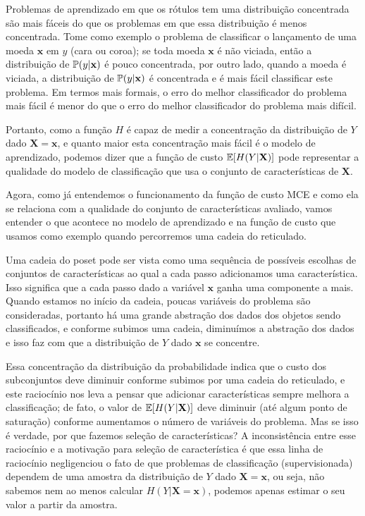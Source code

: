 Problemas de aprendizado em que os rótulos tem uma distribuição 
concentrada são mais fáceis do que os problemas em que essa distribuição
é menos concentrada. Tome como exemplo o problema de
classificar o lançamento de uma moeda $\mathbf{x}$ em $y$ (cara ou 
coroa); se toda moeda $\mathbf{x}$ é não viciada, então a distribuição
de $\mathbb{P} (y | \mathbf{x})$ é pouco concentrada, por outro lado,
quando a moeda é viciada, a distribuição de 
$\mathbb{P} (y | \mathbf{x})$ é concentrada e é mais fácil 
classificar este problema. Em termos mais formais, o erro do melhor 
classificador do problema mais fácil é menor do que o erro do melhor 
classificador do problema mais difícil.

Portanto, como a função $H$ é capaz de medir a concentração da 
distribuição de $Y$ dado $\mathbf{X = x}$, e quanto maior esta 
concentração mais fácil é o modelo de aprendizado, podemos dizer
que a função de custo $\mathbb{E}[H (Y | \mathbf{X})]$ pode 
representar a qualidade do modelo de classificação que usa o conjunto de
características de $\mathbf{X}$.

Agora, como já entendemos o funcionamento da função de custo
MCE e como ela se relaciona com a qualidade do conjunto de 
características avaliado, vamos entender o que acontece no modelo de 
aprendizado e na função de custo que usamos como exemplo quando 
percorremos uma cadeia do reticulado. 

Uma cadeia do poset pode ser vista como uma sequência de possíveis
escolhas de conjuntos de características ao qual a cada passo 
adicionamos uma característica. Isso significa que a cada passo dado
a variável $\mathbf{x}$ ganha uma componente a mais. Quando estamos no 
início da cadeia, poucas variáveis do problema são consideradas, 
portanto há uma grande abstração dos dados dos objetos sendo 
classificados, e conforme subimos uma cadeia, diminuímos a abstração dos
dados e isso faz com que a distribuição de $Y$ dado $\mathbf{x}$ se 
concentre.

Essa concentração da distribuição da probabilidade indica que o custo 
dos subconjuntos deve diminuir conforme subimos por uma cadeia do 
reticulado, e este raciocínio nos leva a pensar que adicionar 
características sempre melhora a classificação; de fato, o valor de
$\mathbb{E}[H (Y | \mathbf{X})]$ deve diminuir (até algum ponto 
de saturação) conforme aumentamos o número de variáveis do problema. 
Mas se isso é verdade, por que fazemos seleção de características? A 
inconsistência entre esse raciocínio e a motivação para seleção de 
característica é que essa linha de raciocínio negligenciou o fato de que 
problemas de classificação (supervisionada) dependem de uma amostra da 
distribuição de $Y$ dado $\mathbf{X = x}$, ou seja, não sabemos nem ao 
menos calcular $H (Y | \mathbf{X = x})$, podemos apenas estimar o seu 
valor a partir da amostra.

